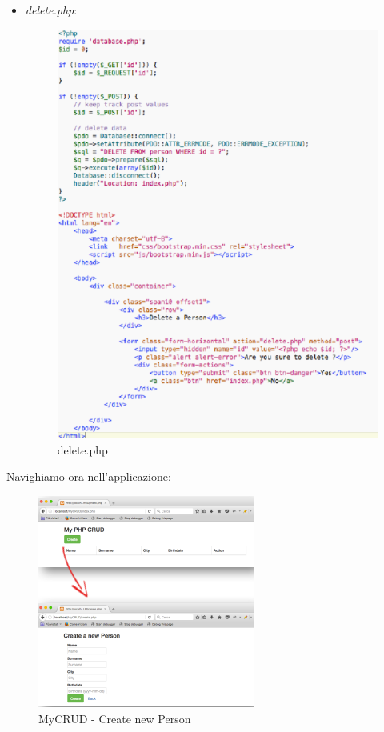 \begin{itemize}
\item{\textit{delete.php}}:

\begin{center}
\begin{figure}[H]
\centering
\includegraphics[scale=1]{figures/deletephp.png}
\caption{delete.php} 
\end{figure}
\end{center}

\end{itemize}

Navighiamo ora nell'applicazione:

\begin{center}
\begin{figure}[H]
\centering
\includegraphics[scale=1]{figures/nav1.png}
\caption{MyCRUD - Create new Person} 
\end{figure}
\end{center}


